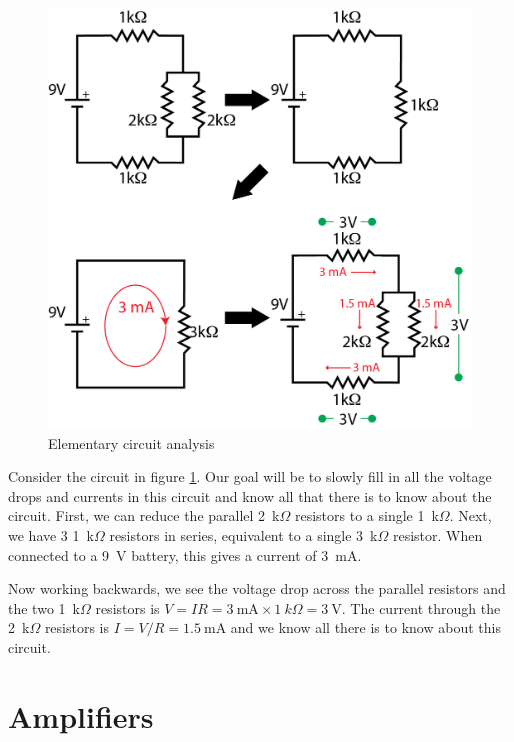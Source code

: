 \documentclass{tufte-book}
\begin{document}
\begin{figure}[h]
\caption{Elementary circuit analysis}
\label{fig:elemcirc}
\begin{center}
\includegraphics{elemcirc.png}
\end{center}
\end{figure}


Consider the circuit in figure \ref{fig:elemcirc}. Our goal will be to slowly fill in all the voltage drops and currents in this circuit and know all that there is to know about the circuit. First, we can reduce the parallel 2~k$\Omega$ resistors to a single 1~k$\Omega$. Next, we have 3 1~k$\Omega$ resistors in series, equivalent to a single 3~k$\Omega$ resistor. When connected to a 9~V battery, this gives a current of 3~mA. 

\noindent Now working backwards, we see the voltage drop across the parallel resistors and the two 1~k$\Omega$ resistors is $V = IR = 3~\text{mA}\times1~k\Omega = 3~\text{V}$. The current through the 2~k$\Omega$ resistors is $I=V/R = 1.5~\text{mA}$ and we know all there is to know about this circuit.

\chapter{Amplifiers}
\end{document}
